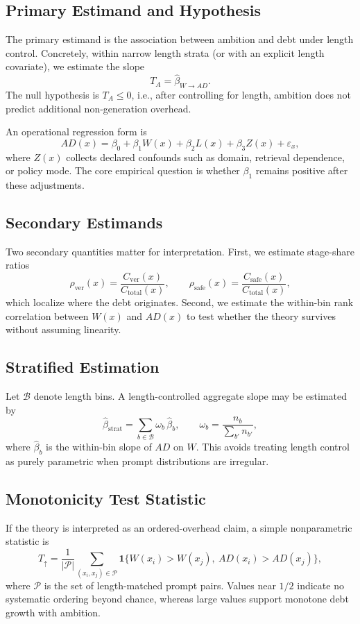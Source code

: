 \documentclass{svjour3}
\begin{document}
\subsection{Primary Estimand and Hypothesis}
The primary estimand is the association between ambition and debt under length control. Concretely, within narrow length strata (or with an explicit length covariate), we estimate the slope
\[
T_A = \hat{\beta}_{W\rightarrow AD}.
\]
The null hypothesis is $T_A\le 0$, i.e., after controlling for length, ambition does not predict additional non-generation overhead.

An operational regression form is
\[
AD(x)=\beta_0+\beta_1W(x)+\beta_2L(x)+\beta_3Z(x)+\varepsilon_x,
\]
where $Z(x)$ collects declared confounds such as domain, retrieval dependence, or policy mode. The core empirical question is whether $\beta_1$ remains positive after these adjustments.

\subsection{Secondary Estimands}
Two secondary quantities matter for interpretation. First, we estimate stage-share ratios
\[
\rho_{\mathrm{ver}}(x)=\frac{C_{\mathrm{ver}}(x)}{C_{\mathrm{total}}(x)},
\qquad
\rho_{\mathrm{safe}}(x)=\frac{C_{\mathrm{safe}}(x)}{C_{\mathrm{total}}(x)},
\]
which localize where the debt originates. Second, we estimate the within-bin rank correlation between $W(x)$ and $AD(x)$ to test whether the theory survives without assuming linearity.

\subsection{Stratified Estimation}
Let $\mathcal{B}$ denote length bins. A length-controlled aggregate slope may be estimated by
\[
\widehat{\beta}_{\mathrm{strat}}=
\sum_{b\in\mathcal{B}}\omega_b\,\widehat{\beta}_b,
\qquad
\omega_b=\frac{n_b}{\sum_{b'}n_{b'}},
\]
where $\widehat{\beta}_b$ is the within-bin slope of $AD$ on $W$. This avoids treating length control as purely parametric when prompt distributions are irregular.

\subsection{Monotonicity Test Statistic}
If the theory is interpreted as an ordered-overhead claim, a simple nonparametric statistic is
\[
T_{\uparrow}=
\frac{1}{|\mathcal{P}|}
\sum_{(x_i,x_j)\in\mathcal{P}}
\mathbf{1}\{W(x_i)>W(x_j),\ AD(x_i)>AD(x_j)\},
\]
where $\mathcal{P}$ is the set of length-matched prompt pairs. Values near $1/2$ indicate no systematic ordering beyond chance, whereas large values support monotone debt growth with ambition.
\end{document}

